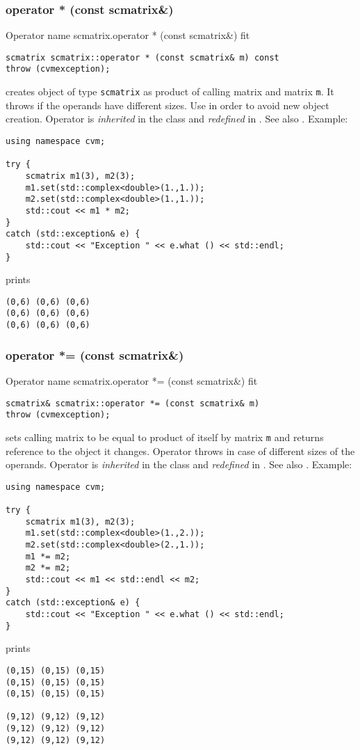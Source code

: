 \subsubsection{operator * (const scmatrix\&)}
Operator%
\pdfdest name {scmatrix.operator * (const scmatrix&)} fit
\begin{verbatim}
scmatrix scmatrix::operator * (const scmatrix& m) const
throw (cvmexception);
\end{verbatim}
creates  object of type \verb"scmatrix"
as  product of  calling matrix and  matrix \verb"m".
It throws  
if the operands have different sizes.
Use  in order to avoid
 new object creation.
Operator is \emph{inherited} in the class
and \emph{redefined} in .
See also
.
Example:
\begin{Verbatim}
using namespace cvm;

try {
    scmatrix m1(3), m2(3);
    m1.set(std::complex<double>(1.,1.));
    m2.set(std::complex<double>(1.,1.));
    std::cout << m1 * m2;
}
catch (std::exception& e) {
    std::cout << "Exception " << e.what () << std::endl;
}
\end{Verbatim}
prints
\begin{Verbatim}
(0,6) (0,6) (0,6)
(0,6) (0,6) (0,6)
(0,6) (0,6) (0,6)
\end{Verbatim}
\newpage




\subsubsection{operator *= (const scmatrix\&)}
Operator%
\pdfdest name {scmatrix.operator *= (const scmatrix&)} fit
\begin{verbatim}
scmatrix& scmatrix::operator *= (const scmatrix& m)
throw (cvmexception);
\end{verbatim}
sets  calling matrix to be equal to  product
of itself by  matrix \verb"m"
and returns  reference to
the object it changes.
Operator throws 
in case of different sizes of the operands.
Operator is \emph{inherited} in the class
and \emph{redefined} in .
See also .
Example:
\begin{Verbatim}
using namespace cvm;

try {
    scmatrix m1(3), m2(3);
    m1.set(std::complex<double>(1.,2.));
    m2.set(std::complex<double>(2.,1.));
    m1 *= m2;
    m2 *= m2;
    std::cout << m1 << std::endl << m2;
}
catch (std::exception& e) {
    std::cout << "Exception " << e.what () << std::endl;
}
\end{Verbatim}
prints
\begin{Verbatim}
(0,15) (0,15) (0,15)
(0,15) (0,15) (0,15)
(0,15) (0,15) (0,15)

(9,12) (9,12) (9,12)
(9,12) (9,12) (9,12)
(9,12) (9,12) (9,12)
\end{Verbatim}
\newpage



